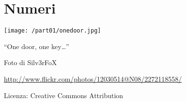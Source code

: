 \part{Numeri}

\texttt{[image: /part01/onedoor.jpg]}
  \begin{center}
    {\large ``One door, one key\ldots''}\par
    Foto di Silv3rFoX\par
    \url{http://www.flickr.com/photos/12030514@N08/2272118558/}\par
    Licenza: Creative Commons Attribution\par
  \end{center}
\clearpage
\cleardoublepage